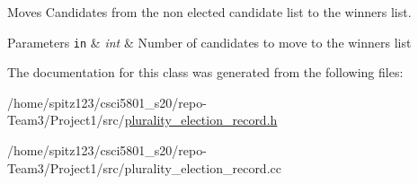 Moves Candidates from the non elected candidate list to the winners list. 


\begin{DoxyParams}[1]{Parameters}
\mbox{\tt in}  & {\em int} & Number of candidates to move to the winners list \\
\hline
\end{DoxyParams}


The documentation for this class was generated from the following files\+:\begin{DoxyCompactItemize}
\item 
/home/spitz123/csci5801\+\_\+s20/repo-\/\+Team3/\+Project1/src/\hyperlink{plurality__election__record_8h}{plurality\+\_\+election\+\_\+record.\+h}\item 
/home/spitz123/csci5801\+\_\+s20/repo-\/\+Team3/\+Project1/src/plurality\+\_\+election\+\_\+record.\+cc\end{DoxyCompactItemize}
